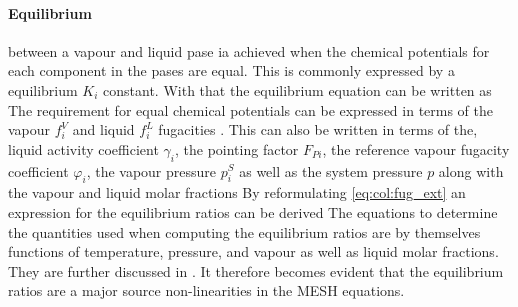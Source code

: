         \paragraph{Equilibrium} between a vapour and liquid pase ia achieved when the chemical potentials for each
        component in the pases are equal. This is commonly expressed by a equilibrium $K_i$ constant. With
        that the equilibrium equation can be written as
        The requirement for equal chemical potentials can be expressed in terms of the vapour $f_i^V$
        and liquid $f_i^L$ fugacities \cite{AndreasPfennig.2003}.
        This can also be written in terms of the, liquid activity coefficient $\gamma_i$,
        the pointing factor $F_{Pi}$, the reference vapour fugacity coefficient $\varphi_i$,
        the vapour pressure $p^S_i$ as well as the system pressure $p$ along with the vapour and
        liquid molar fractions
        By reformulating \eqref{eq:col:fug_ext} an expression for the equilibrium ratios
        can be derived
        The equations to determine the quantities used when computing the equilibrium ratios are by
        themselves functions of temperature, pressure, and vapour as well as liquid molar fractions.
        They are further discussed in . It therefore becomes evident that the
        equilibrium ratios are a major source  non-linearities in the MESH equations.

